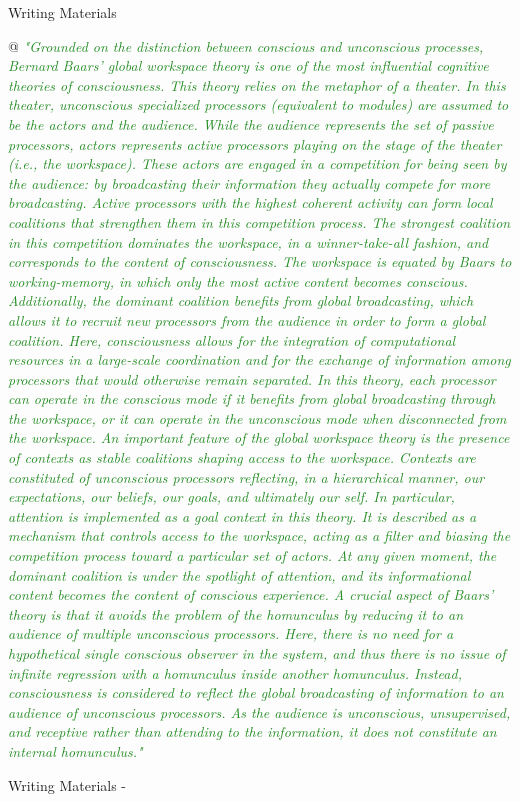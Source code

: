 \documentclass[utf8]{article}
\newenvironment{WritingMaterials} %
    	{
            \begin{tcolorbox}[enhanced,
                title=-,
                size=small,
                colbacktitle=Aquamarine,
                drop fuzzy shadow,
                fontupper=\small,
                boxrule=0.4pt,
                colback=Aquamarine!10!white,
                sharp corners]
                Writing Materials
            \end{tcolorbox}
            \begin{easylist}[itemize]
    	}
    	{
            \end{easylist}  
            \begin{tcolorbox}[enhanced,
                halign=flush right,
                halign title=right,
                size=small,
                colbacktitle=Aquamarine,
                drop fuzzy shadow,
                fontupper=\small,
                boxrule=0.4pt,
                colback=Aquamarine,
                colupper=White,
                sharp corners]
                Writing Materials -
            \end{tcolorbox}        
    	}
\newcommand{\rewrite}[1]{\textcolor{ForestGreen}{\textit{"#1"}}\newline}
\newcommand{\rlend}{\cbend}
\begin{document}
\begin{WritingMaterials}
				@ \rewrite{Grounded on the distinction between conscious and unconscious processes, Bernard Baars’ global workspace theory is one of the most influential cognitive theories of consciousness. This theory relies on the metaphor of a theater. In this theater, unconscious specialized processors (equivalent to modules) are assumed to be the actors and the audience. While the audience represents the set of passive processors, actors represents active processors playing on the stage of the theater (i.e., the workspace). These actors are engaged in a competition for being seen by the audience: by broadcasting their information they actually compete for more broadcasting. Active processors with the highest coherent activity can form local coalitions that strengthen them in this competition process. The strongest coalition in this competition dominates the workspace, in a winner-take-all fashion, and corresponds to the content of consciousness. The workspace is equated by Baars to working-memory, in which only the most active content becomes conscious. Additionally, the dominant coalition benefits from global broadcasting, which allows it to recruit new processors from the audience in order to form a global coalition. Here, consciousness allows for the integration of computational resources in a large-scale coordination and for the exchange of information among processors that would otherwise remain separated. In this theory, each processor can operate in the conscious mode if it benefits from global broadcasting through the workspace, or it can operate in the unconscious mode when disconnected from the workspace. An important feature of the global workspace theory is the presence of contexts as stable coalitions shaping access to the workspace. Contexts are constituted of unconscious processors reflecting, in a hierarchical manner, our expectations, our beliefs, our goals, and ultimately our self. In particular, attention is implemented as a goal context in this theory. It is described as a mechanism that controls access to the workspace, acting as a filter and biasing the competition process toward a particular set of actors. At any given moment, the dominant coalition is under the spotlight of attention, and its informational content becomes the content of conscious experience. A crucial aspect of Baars’ theory is that it avoids the problem of the homunculus by reducing it to an audience of multiple unconscious processors. Here, there is no need for a hypothetical single conscious observer in the system, and thus there is no issue of infinite regression with a homunculus inside another homunculus. Instead, consciousness is considered to reflect the global broadcasting of information to an audience of unconscious processors. As the audience is unconscious, unsupervised, and receptive rather than attending to the information, it does not constitute an internal homunculus.}



			\end{WritingMaterials}
\rlend
\end{document}
